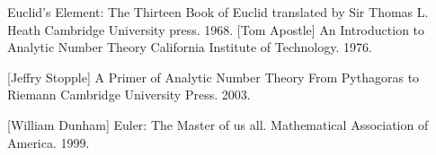 \documentclass[12pt]{article}
\theoremstyle{definition}
\theoremstyle{plain}
\theoremstyle{remark}
\begin{document}
\newpage
 \begin{thebibliography}{9}

Euclid's Element:
The Thirteen Book of Euclid translated by Sir Thomas L. Heath
Cambridge University press. 1968.
[Tom Apostle]
An Introduction to Analytic Number Theory
California Institute of Technology. 1976.

[Jeffry Stopple]
A Primer of Analytic Number Theory From Pythagoras to Riemann
Cambridge  University  Press. 2003.

[William Dunham]
Euler: The Master of us all.
Mathematical Association of America. 1999.
\end{thebibliography}
\end{document}
